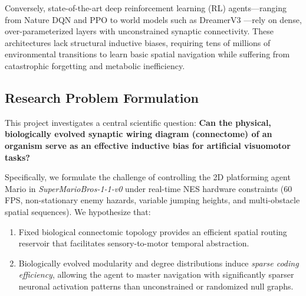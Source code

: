 \documentclass[10pt,twocolumn]{article}
\begin{document}
Conversely, state-of-the-art deep reinforcement learning (RL) agents---ranging from Nature DQN \cite{mnih2015human} and PPO \cite{schulman2017proximal} to world models such as DreamerV3 \cite{hafner2023mastering}---rely on dense, over-parameterized layers with unconstrained synaptic connectivity. These architectures lack structural inductive biases, requiring tens of millions of environmental transitions to learn basic spatial navigation while suffering from catastrophic forgetting and metabolic inefficiency.

\subsection{Research Problem Formulation}
This project investigates a central scientific question: \textbf{Can the physical, biologically evolved synaptic wiring diagram (connectome) of an organism serve as an effective inductive bias for artificial visuomotor tasks?}

Specifically, we formulate the challenge of controlling the 2D platforming agent Mario in \textit{SuperMarioBros-1-1-v0} under real-time NES hardware constraints (60 FPS, non-stationary enemy hazards, variable jumping heights, and multi-obstacle spatial sequences). We hypothesize that:
\begin{enumerate}
    \item Fixed biological connectomic topology provides an efficient spatial routing reservoir that facilitates sensory-to-motor temporal abstraction.
    \item Biologically evolved modularity and degree distributions induce \textit{sparse coding efficiency}, allowing the agent to master navigation with significantly sparser neuronal activation patterns than unconstrained or randomized null graphs.
\end{enumerate}
\end{document}
